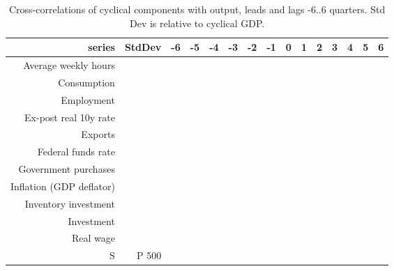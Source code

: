 \begin{table}[ht]
\centering
\caption{Cross-correlations of cyclical components with output, leads and lags -6..6 quarters. Std Dev is relative to cyclical GDP.} 
\label{tab:ccf}
\begin{tabular}{rrrrrrrrrrrrrrr}
  \hline
series & StdDev & -6 & -5 & -4 & -3 & -2 & -1 & 0 & 1 & 2 & 3 & 4 & 5 & 6 \\ 
  \hline
Average weekly hours &  &  &  &  &  &  &  &  &  &  &  &  &  &  \\ 
  Consumption &  &  &  &  &  &  &  &  &  &  &  &  &  &  \\ 
  Employment &  &  &  &  &  &  &  &  &  &  &  &  &  &  \\ 
  Ex-post real 10y rate &  &  &  &  &  &  &  &  &  &  &  &  &  &  \\ 
  Exports &  &  &  &  &  &  &  &  &  &  &  &  &  &  \\ 
  Federal funds rate &  &  &  &  &  &  &  &  &  &  &  &  &  &  \\ 
  Government purchases &  &  &  &  &  &  &  &  &  &  &  &  &  &  \\ 
  Inflation (GDP deflator) &  &  &  &  &  &  &  &  &  &  &  &  &  &  \\ 
  Inventory investment &  &  &  &  &  &  &  &  &  &  &  &  &  &  \\ 
  Investment &  &  &  &  &  &  &  &  &  &  &  &  &  &  \\ 
  Real wage &  &  &  &  &  &  &  &  &  &  &  &  &  &  \\ 
  S&P 500 &  &  &  &  &  &  &  &  &  &  &  &  &  &  \\ 
   \hline
\end{tabular}
\end{table}
